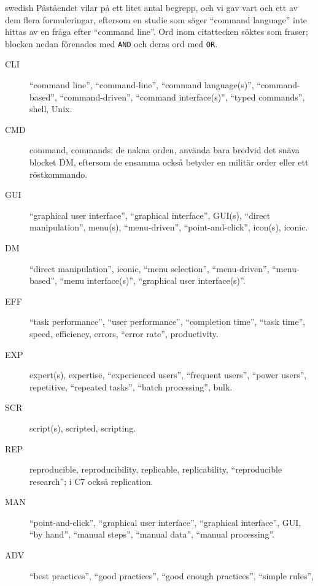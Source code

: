 \begin{onlyin}{swedish}
Påståendet vilar på ett litet antal begrepp, och vi gav vart och ett av
dem flera formuleringar, eftersom en studie som säger \enquote{command
language} inte hittas av en fråga efter \enquote{command line}.  Ord
inom citattecken söktes som fraser; blocken nedan förenades med
\texttt{AND} och deras ord med \texttt{OR}.
\begingroup\raggedright
\begin{description}
  \item[CLI] \enquote{command line}, \enquote{command-line},
    \enquote{command language(s)}, \enquote{command-based},
    \enquote{command-driven}, \enquote{command interface(s)},
    \enquote{typed commands}, shell, Unix.
  \item[CMD] command, commands: de nakna orden, använda bara bredvid det
    snäva blocket DM, eftersom de ensamma också betyder en militär order
    eller ett röstkommando.
  \item[GUI] \enquote{graphical user interface}, \enquote{graphical
    interface}, GUI(s), \enquote{direct manipulation}, menu(s),
    \enquote{menu-driven}, \enquote{point-and-click}, icon(s), iconic.
  \item[DM] \enquote{direct manipulation}, iconic, \enquote{menu
    selection}, \enquote{menu-driven}, \enquote{menu-based},
    \enquote{menu interface(s)}, \enquote{graphical user
    interface(s)}.
  \item[EFF] \enquote{task performance}, \enquote{user performance},
    \enquote{completion time}, \enquote{task time}, speed, efficiency,
    errors, \enquote{error rate}, productivity.
  \item[EXP] expert(s), expertise, \enquote{experienced users},
    \enquote{frequent users}, \enquote{power users}, repetitive,
    \enquote{repeated tasks}, \enquote{batch processing}, bulk.
  \item[SCR] script(s), scripted, scripting.
  \item[REP] reproducible, reproducibility, replicable, replicability,
    \enquote{reproducible research}; i C7 också replication.
  \item[MAN] \enquote{point-and-click}, \enquote{graphical user
    interface}, \enquote{graphical interface}, GUI, \enquote{by hand},
    \enquote{manual steps}, \enquote{manual data}, \enquote{manual
    processing}.
  \item[ADV] \enquote{best practices}, \enquote{good practices},
    \enquote{good enough practices}, \enquote{simple rules},

\end{description}
\end{onlyin}
